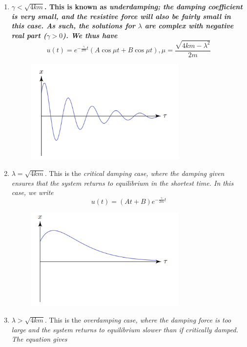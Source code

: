 \documentclass{article}
\begin{document}
\begin{enumerate}
    \item \bf $\gamma < \sqrt{4km}$. \normalfont This is known as \it underdamping\normalfont; the damping coefficient is very small, and the resistive force will also be fairly small in this case. As such, the solutions for $\lambda$ are complex with negative real part ($\gamma > 0$). We thus have 
    \begin{equation*}
        u(t) = e^{-\frac{\gamma}{2m}t}(A\cos \mu t + B\cos \mu t), \mu = \frac{\sqrt{4km-\lambda^2}}{2m}
    \end{equation*}
    \begin{figure}[h]
        \centering
        \includegraphics[width=8cm]{DE-ch3-underdamping.png}
    \end{figure} 
    \item $\lambda = \sqrt{4km}$. This is the \it critical damping \normalfont case, where the damping given ensures that the system returns to equilibrium in the shortest time. In this case, we write
    \begin{equation*}
        u(t) = (At+B)e^{-\frac{\gamma}{2m}t}
    \end{equation*}
    \begin{figure}[h]
        \centering
        \includegraphics[width=8cm]{DE-ch3-criticaldamping.png}
    \end{figure} 
    \item $\lambda > \sqrt{4km}$. This is the \it overdamping \normalfont case, where the damping force is too large and the system returns to equilibrium slower than if critically damped. The equation gives

\end{enumerate}
\end{document}
